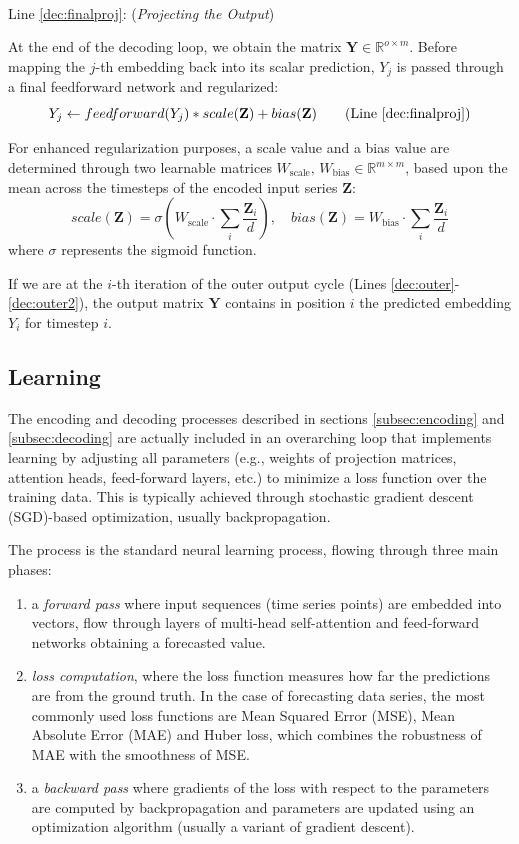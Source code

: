 \documentclass[algorithms,article,submit,pdftex,moreauthors]{Definitions/mdpi}
\begin{document}
~\\Line \ref{dec:finalproj}: (\textit{Projecting the Output})

\noindent At the end of the decoding loop, we obtain the matrix $\textbf{Y} \in \mathbb{R}^{o \times m}$.
Before mapping the $j$-th embedding back into its scalar prediction, $Y_j$ is passed through a final feedforward network and regularized:
\begin{equation}
    Y_j \leftarrow feedforward(Y_j) * scale(\textbf{Z}) + bias(\textbf{Z})
    \tag{Line \ref{dec:finalproj}}
\end{equation}

For enhanced regularization purposes, a scale value and a bias value are determined through two learnable matrices $W_\text{scale},\,W_\text{bias} \in \mathbb{R}^{m \times m}$, based upon the mean across the timesteps of the encoded input series $\textbf{Z}$:
$$
    scale(\textbf{Z}) = \sigma\left(W_\text{scale} \cdot \sum_{i} \dfrac{\textbf{Z}_i}{d}\right), \quad bias(\textbf{Z}) = W_\text{bias} \cdot \sum_{i} \dfrac{\textbf{Z}_i}{d}
$$
where $\sigma$ represents the sigmoid function.

If we are at the $i$-th iteration of the outer output cycle (Lines \ref{dec:outer}-\ref{dec:outer2}), the output matrix $\textbf{Y}$ contains in position $i$ the predicted embedding $Y_i$ for timestep $i$.

\subsection{Learning} \label{subsec:learning}

The encoding and decoding processes described in sections \ref{subsec:encoding} and \ref{subsec:decoding} are actually included in an overarching loop that implements learning by adjusting all parameters (e.g., weights of projection matrices, attention heads, feed-forward layers, etc.) to minimize a loss function over the training data. This is typically achieved through stochastic gradient descent (SGD)-based optimization, usually backpropagation.

The process is the standard neural learning process, flowing through three main phases:
\begin{enumerate}
    \item a {\it forward pass} where input sequences (time series points) are embedded into vectors, flow through layers of multi-head self-attention and feed-forward networks obtaining a forecasted value.

    \item {\it loss computation}, where the loss function measures how far the predictions are from the ground truth. In the case of forecasting data series, the most commonly used loss functions are Mean Squared Error (MSE), Mean Absolute Error (MAE) and Huber loss, which combines the robustness of MAE with the smoothness of MSE.

    \item a {\it backward pass} where gradients of the loss with respect to the parameters are computed by backpropagation and parameters are updated using an optimization algorithm (usually a variant of gradient descent).
\end{enumerate}
\end{document}
